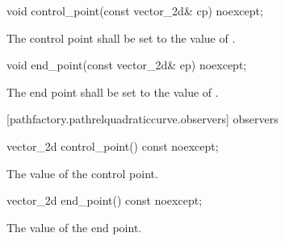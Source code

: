\begin{itemdecl}
    void control_point(const vector_2d& cp) noexcept;
\end{itemdecl}
\begin{itemdescr}
	\pnum
	\effects
	The control point shall be set to the value of .
\end{itemdescr}

\begin{itemdecl}
    void end_point(const vector_2d& ep) noexcept;
\end{itemdecl}
\begin{itemdescr}
	\pnum
	\effects
	The end point shall be set to the value of .
\end{itemdescr}

 [pathfactory.pathrelquadraticcurve.observers]{ observers}

\begin{itemdecl}
    vector_2d control_point() const noexcept;
\end{itemdecl}
\begin{itemdescr}
	\pnum
	\returns
	The value of the control point.
\end{itemdescr}

\begin{itemdecl}
    vector_2d end_point() const noexcept;
\end{itemdecl}
\begin{itemdescr}
	\pnum
	\returns
	The value of the end point.
\end{itemdescr}
